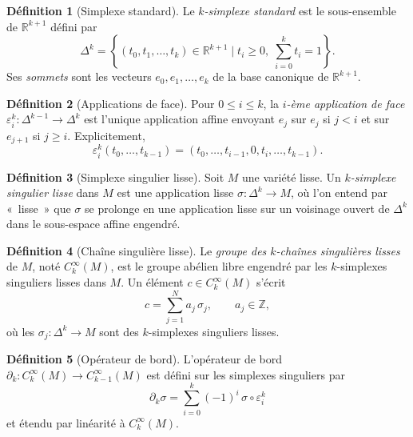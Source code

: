 \documentclass[12pt,a4paper,openany]{book}
\theoremstyle{definition}
\newtheorem{definition}{Définition}[chapter]
\theoremstyle{plain}
\theoremstyle{remark}
\newcommand{\Z}{\mathbb{Z}}
\newcommand{\R}{\mathbb{R}}
\newcommand{\set}[1]{\left\{#1\right\}}
\begin{document}
\begin{definition}[Simplexe standard]\label{def:simplexe-standard}
Le \emph{$k$-simplexe standard} est le sous-ensemble de $\R^{k+1}$ défini par
\[
  \Delta^k = \set{(t_0, t_1, \dots, t_k) \in \R^{k+1} \mid t_i \geq 0,\;
  \sum_{i=0}^{k} t_i = 1}.
\]
Ses \emph{sommets} sont les vecteurs $e_0, e_1, \dots, e_k$ de la base
canonique de $\R^{k+1}$.
\end{definition}

\begin{definition}[Applications de face]\label{def:face}
Pour $0 \leq i \leq k$, la \emph{$i$-ème application de face}
$\varepsilon_i^k \colon \Delta^{k-1} \to \Delta^k$ est l'unique
application affine envoyant $e_j$ sur $e_j$ si $j < i$ et sur $e_{j+1}$
si $j \geq i$. Explicitement,
\[
  \varepsilon_i^k(t_0, \dots, t_{k-1})
  = (t_0, \dots, t_{i-1}, 0, t_i, \dots, t_{k-1}).
\]
\end{definition}

\begin{definition}[Simplexe singulier lisse]\label{def:simplexe-singulier}
Soit $M$ une variété lisse. Un \emph{$k$-simplexe singulier lisse} dans $M$
est une application lisse $\sigma \colon \Delta^k \to M$, où l'on entend
par «~lisse~» que $\sigma$ se prolonge en une application lisse sur un
voisinage ouvert de $\Delta^k$ dans le sous-espace affine engendré.
\end{definition}

\begin{definition}[Chaîne singulière lisse]\label{def:chaine-singuliere}
Le \emph{groupe des $k$-chaînes singulières lisses} de $M$, noté
$C_k^\infty(M)$, est le groupe abélien libre engendré par les $k$-simplexes
singuliers lisses dans $M$. Un élément $c \in C_k^\infty(M)$ s'écrit
\[
  c = \sum_{j=1}^{N} a_j \, \sigma_j, \qquad a_j \in \Z,
\]
où les $\sigma_j \colon \Delta^k \to M$ sont des $k$-simplexes singuliers
lisses.
\end{definition}

\begin{definition}[Opérateur de bord]\label{def:bord-chaines}
L'opérateur de bord $\partial_k \colon C_k^\infty(M) \to C_{k-1}^\infty(M)$
est défini sur les simplexes singuliers par
\[
  \partial_k \sigma = \sum_{i=0}^{k} (-1)^i \, \sigma \circ \varepsilon_i^k
\]
et étendu par linéarité à $C_k^\infty(M)$.
\end{definition}
\end{document}
